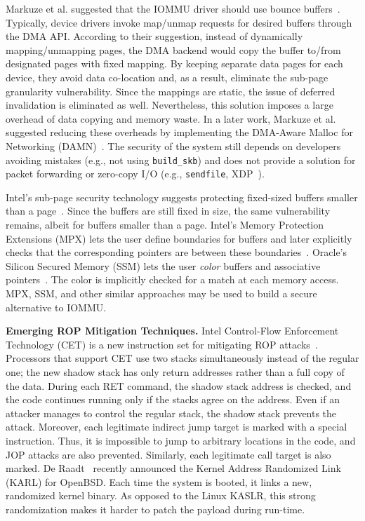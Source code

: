 Markuze et al. suggested that the IOMMU driver should use bounce buffers~\cite{MMT16}. Typically, device drivers invoke map/unmap requests for desired buffers through the DMA API. According to their suggestion, instead of dynamically mapping/unmapping pages, the DMA backend would copy the buffer to/from designated pages with fixed mapping. By keeping separate data pages for each device, they avoid data co-location and, as a result, eliminate the sub-page granularity vulnerability. Since the mappings are static, the issue of deferred invalidation is eliminated as well. 
%
Nevertheless, this solution imposes a large overhead of data copying and memory waste. In a later work, Markuze et al. suggested reducing these overheads by implementing the DMA-Aware Malloc for Networking (DAMN)~\cite{MSMT18}. The security of the system still depends on developers avoiding mistakes (e.g., not using \texttt{build\_skb}) and does not provide a solution for packet forwarding or zero-copy I/O (e.g., \texttt{sendfile}, XDP~\cite{xdp}). %

Intel’s sub-page security technology suggests protecting fixed-sized buffers smaller than a page~\cite{Int18}. Since the buffers are still fixed in size, the same vulnerability remains, albeit for buffers smaller than a page. Intel's Memory Protection Extensions (MPX) lets the user define boundaries for buffers and later explicitly checks that the corresponding pointers are between these boundaries~\cite{Int16a}. Oracle's Silicon Secured Memory (SSM) lets the user \emph{color} buffers and associative pointers~\cite{Ora15}. The color is implicitly checked for a match at each memory access. MPX, SSM, and other similar approaches may be used to build a secure alternative to IOMMU. 

\smallskip
\noindent\textbf{Emerging ROP Mitigation Techniques.}
Intel Control-Flow Enforcement Technology (CET) is a new instruction set for mitigating ROP attacks~\cite{Int17}. Processors that support CET use two stacks simultaneously instead of the regular one; the new shadow stack has only return addresses rather than a full copy of the data. During each RET command, the shadow stack address is checked, and the code continues running only if the stacks agree on the address. Even if an attacker manages to control the regular stack, the shadow stack prevents the attack. Moreover, each legitimate indirect jump target is marked with a special instruction. Thus, it is impossible to jump to arbitrary locations in the code, and JOP attacks are also prevented. Similarly, each legitimate call target is also marked. De Raadt~\cite{dr17} recently announced the Kernel Address Randomized Link (KARL) for OpenBSD. Each time the system is booted, it links a new, randomized kernel binary. As opposed to the Linux KASLR, this strong randomization makes it harder to patch the payload during run-time. 

